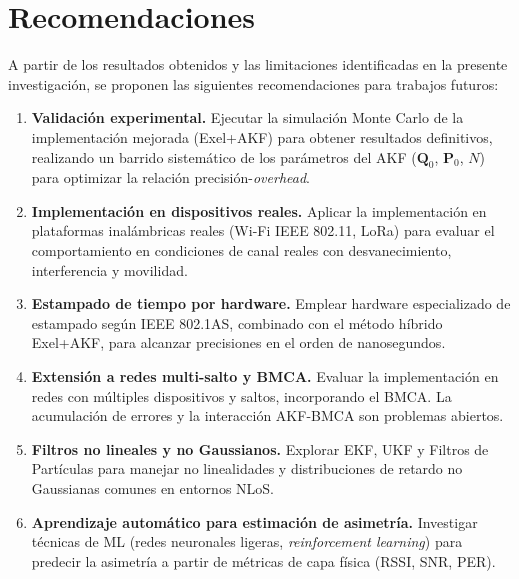 
\chapter{Recomendaciones}
\label{ch:recomendaciones}

A partir de los resultados obtenidos y las limitaciones identificadas en la presente investigación, se proponen las siguientes recomendaciones para trabajos futuros:

\begin{enumerate}
\item \textbf{Validación experimental.} Ejecutar la simulación Monte Carlo de la implementación mejorada (Exel+AKF) para obtener resultados definitivos, realizando un barrido sistemático de los parámetros del AKF ($\mathbf{Q}_0$, $\mathbf{P}_0$, $N$) para optimizar la relación precisión-\textit{overhead}.

\item \textbf{Implementación en dispositivos reales.} Aplicar la implementación en plataformas inalámbricas reales (Wi-Fi IEEE 802.11, LoRa) para evaluar el comportamiento en condiciones de canal reales con desvanecimiento, interferencia y movilidad.

\item \textbf{Estampado de tiempo por hardware.} Emplear hardware especializado de estampado según IEEE 802.1AS, combinado con el método híbrido Exel+AKF, para alcanzar precisiones en el orden de nanosegundos.

\item \textbf{Extensión a redes multi-salto y BMCA.} Evaluar la implementación en redes con múltiples dispositivos y saltos, incorporando el BMCA. La acumulación de errores y la interacción AKF-BMCA son problemas abiertos.

\item \textbf{Filtros no lineales y no Gaussianos.} Explorar EKF, UKF y Filtros de Partículas para manejar no linealidades y distribuciones de retardo no Gaussianas comunes en entornos NLoS.

\item \textbf{Aprendizaje automático para estimación de asimetría.} Investigar técnicas de ML (redes neuronales ligeras, \textit{reinforcement learning}) para predecir la asimetría a partir de métricas de capa física (RSSI, SNR, PER).


\end{enumerate}
